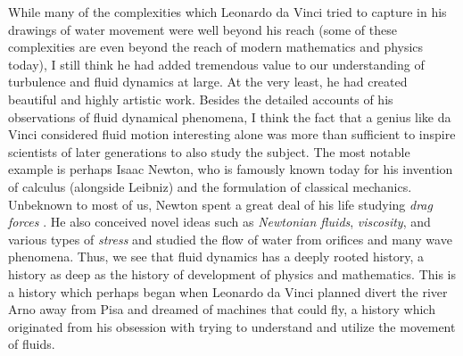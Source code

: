 \documentclass[12pt]{article}
\begin{document}
While many of the complexities which Leonardo da Vinci tried to capture in his drawings of water movement were well beyond his reach (some of these complexities are even beyond the reach of modern mathematics and physics today), I still think he had added tremendous value to our understanding of turbulence and fluid dynamics at large. At the very least, he had created beautiful and highly artistic work. Besides the detailed accounts of his observations of fluid dynamical phenomena, I think the fact that a genius like da Vinci considered fluid motion interesting alone was more than sufficient to inspire scientists of later generations to also study the subject. The most notable example is perhaps Isaac Newton, who is famously known today for his invention of calculus (alongside Leibniz) and the formulation of classical mechanics. Unbeknown to most of us, Newton spent a great deal of his life studying \textit{drag forces} \cite{smith1998newton}.  He also conceived novel ideas such as \textit{Newtonian fluids}, \textit{viscosity}, and various types of \textit{stress} and studied the flow of water from orifices and many wave phenomena. Thus, we see that fluid dynamics has a deeply rooted history, a history as deep as the history of development of physics and mathematics. This is a history which perhaps began when Leonardo da Vinci planned divert the river Arno away from Pisa and dreamed of machines that could fly, a history which originated from his obsession with trying to understand and utilize the movement of fluids. 







\end{document}
